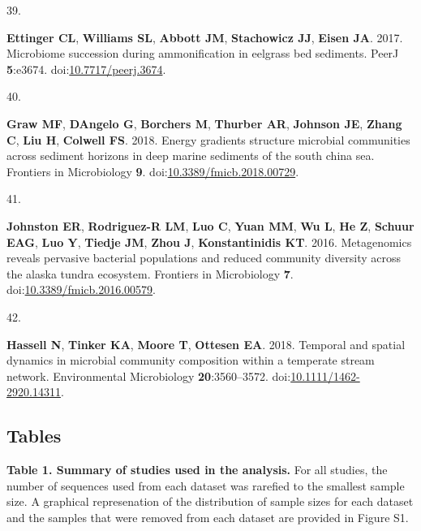 \documentclass[
]{article}
\newlength{\cslhangindent}
\newlength{\csllabelwidth}
\newlength{\cslentryspacingunit} %
\newenvironment{CSLReferences}[2] %
 {%
  \setlength{\parindent}{0pt}
  \ifodd #1
  \let\oldpar\par
  \def\par{\hangindent=\cslhangindent\oldpar}
  \fi
  \setlength{\parskip}{#2\cslentryspacingunit}
 }%
 {}
\newcommand{\CSLLeftMargin}[1]{\parbox[t]{\csllabelwidth}{#1}}
\newcommand{\CSLRightInline}[1]{\parbox[t]{\linewidth - \csllabelwidth}{#1}\break}
\begin{document}
\begin{CSLReferences}{0}{1}
\leavevmode{}%
\CSLLeftMargin{39. }%
\CSLRightInline{\textbf{Ettinger CL}, \textbf{Williams SL},
\textbf{Abbott JM}, \textbf{Stachowicz JJ}, \textbf{Eisen JA}. 2017.
Microbiome succession during ammonification in eelgrass bed sediments.
{PeerJ} \textbf{5}:e3674.
doi:\href{https://doi.org/10.7717/peerj.3674}{10.7717/peerj.3674}.}

\leavevmode{}%
\CSLLeftMargin{40. }%
\CSLRightInline{\textbf{Graw MF}, \textbf{DAngelo G}, \textbf{Borchers
M}, \textbf{Thurber AR}, \textbf{Johnson JE}, \textbf{Zhang C},
\textbf{Liu H}, \textbf{Colwell FS}. 2018. Energy gradients structure
microbial communities across sediment horizons in deep marine sediments
of the south china sea. Frontiers in Microbiology \textbf{9}.
doi:\href{https://doi.org/10.3389/fmicb.2018.00729}{10.3389/fmicb.2018.00729}.}

\leavevmode{}%
\CSLLeftMargin{41. }%
\CSLRightInline{\textbf{Johnston ER}, \textbf{Rodriguez-R LM},
\textbf{Luo C}, \textbf{Yuan MM}, \textbf{Wu L}, \textbf{He Z},
\textbf{Schuur EAG}, \textbf{Luo Y}, \textbf{Tiedje JM}, \textbf{Zhou
J}, \textbf{Konstantinidis KT}. 2016. Metagenomics reveals pervasive
bacterial populations and reduced community diversity across the alaska
tundra ecosystem. Frontiers in Microbiology \textbf{7}.
doi:\href{https://doi.org/10.3389/fmicb.2016.00579}{10.3389/fmicb.2016.00579}.}

\leavevmode{}%
\CSLLeftMargin{42. }%
\CSLRightInline{\textbf{Hassell N}, \textbf{Tinker KA}, \textbf{Moore
T}, \textbf{Ottesen EA}. 2018. Temporal and spatial dynamics in
microbial community composition within a temperate stream network.
Environmental Microbiology \textbf{20}:3560--3572.
doi:\href{https://doi.org/10.1111/1462-2920.14311}{10.1111/1462-2920.14311}.}

\end{CSLReferences}


\setlength{\parindent}{0in}
\setlength{\leftskip}{0in}

\newpage

\hypertarget{tables}{%
\subsection{Tables}\label{tables}}

\textbf{Table 1. Summary of studies used in the analysis.} For all
studies, the number of sequences used from each dataset was rarefied to
the smallest sample size. A graphical represenation of the distribution
of sample sizes for each dataset and the samples that were removed from
each dataset are provided in Figure S1.
\end{document}
